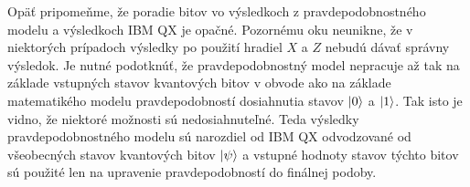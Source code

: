 Opäť pripomeňme, že poradie bitov vo výsledkoch z pravdepodobnostného modelu
a výsledkoch IBM QX je opačné. Pozornému oku neunikne, že v niektorých 
prípadoch výsledky po použití hradiel \(X\) a \(Z\) nebudú dávať správny 
výsledok. Je nutné podotknúť, že pravdepodobnostný model nepracuje až tak 
na základe vstupných stavov kvantových bitov v obvode ako na základe
matematikého modelu pravdepodobností dosiahnutia stavov \(\ket{0}\) a 
\(\ket{1}\). Tak isto je vidno, že niektoré možnosti sú nedosiahnuteľné.
Teda výsledky pravdepodobnostného modelu sú narozdiel od IBM QX odvodzované od
všeobecných stavov kvantových bitov \(\ket{\psi}\) a vstupné hodnoty stavov
týchto bitov sú použité len na upravenie pravdepodobností do finálnej podoby.
